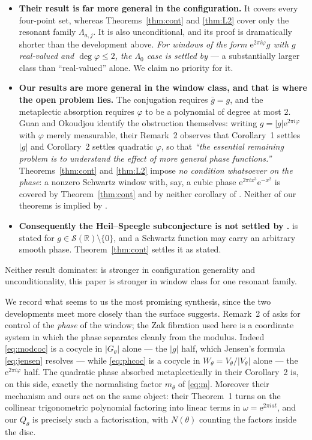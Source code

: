 \documentclass[11pt]{amsart}
\theoremstyle{remark}
\newcommand{\R}{\mathbb R}
\newcommand{\e}{\mathrm e}
\begin{document}
\begin{itemize}
\item \textbf{Their result is far more general in the configuration.} It covers every
four-point set, whereas Theorems~\ref{thm:cont} and \ref{thm:L2} cover only the resonant
family $\Lambda_{a,j}$. It is also unconditional, and its proof is dramatically shorter than
the development above. \emph{For windows of the form $\e^{2\pi i\varphi}g$ with $g$
real-valued and $\deg\varphi\leq2$, the $\Lambda_0$ case is settled by \cite{GO}} --- a
substantially larger class than ``real-valued'' alone. We claim no priority for it.

\item \textbf{Our results are more general in the window class, and that is where the open
problem lies.} The conjugation requires $\bar g=g$, and the metaplectic absorption requires
$\varphi$ to be a polynomial of degree at most $2$. Guan and Okoudjou identify the obstruction
themselves: writing $g=|g|\e^{2\pi i\varphi}$ with $\varphi$ merely measurable, their
Remark~2 observes that Corollary~1 settles $|g|$ and Corollary~2 settles quadratic $\varphi$,
so that \emph{``the essential remaining problem is to understand the effect of more general
phase functions.''} Theorems~\ref{thm:cont} and \ref{thm:L2} impose \emph{no condition
whatsoever on the phase}: a nonzero Schwartz window with, say, a cubic phase
$\e^{2\pi ix^3}\e^{-x^2}$ is covered by Theorem~\ref{thm:cont} and by neither corollary of
\cite{GO}. Neither of our theorems is implied by \cite{GO}.

\item \textbf{Consequently the Heil--Speegle subconjecture is not settled by \cite{GO}.}
\cite[Conjecture~2]{HS} is stated for $g\in\mathcal S(\R)\setminus\{0\}$, and a Schwartz
function may carry an arbitrary smooth phase. Theorem~\ref{thm:cont} settles it as stated.
\end{itemize}

Neither result dominates: \cite{GO} is stronger in configuration generality and
unconditionality, this paper is stronger in window class for one resonant family.

We record what seems to us the most promising synthesis, since the two developments meet more
closely than the surface suggests. Remark~2 of \cite{GO} asks for control of the \emph{phase}
of the window; the Zak fibration used here is a coordinate system in which the phase separates
cleanly from the modulus. Indeed \eqref{eq:modcoc} is a cocycle in $|G_\theta|$ alone --- the
$|g|$ half, which Jensen's formula \eqref{eq:jensen} resolves --- while \eqref{eq:phcoc} is a
cocycle in $W_\theta=V_\theta/|V_\theta|$ alone --- the $\e^{2\pi i\varphi}$ half. The
quadratic phase absorbed metaplectically in their Corollary~2 is, on this side, exactly the
normalising factor $m_\theta$ of \eqref{eq:m}. Moreover their mechanism and ours act on the
same object: their Theorem~1 turns on the collinear trigonometric polynomial factoring into
linear terms in $\omega=\e^{2\pi iat}$, and our $Q_\theta$ is precisely such a factorisation,
with $N(\theta)$ counting the factors inside the disc.
\end{document}
